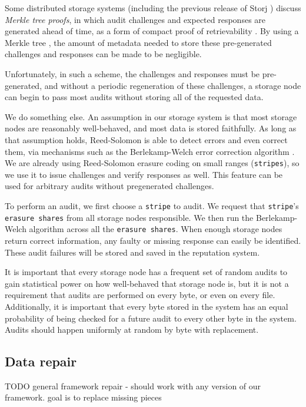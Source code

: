\documentclass[a4paper,10pt]{article} \usepackage[utf8]{inputenc}
\newcommand{\x}[1]{{\tt #1}} \newcommand{\code}[1]{{\tt #1}}
\newcommand{\todo}[1]{{\color{red} TODO #1 }}
\begin{document}
Some distributed storage systems (including the previous release of Storj
\cite{storj-v2}) discuss {\em Merkle tree proofs}, in which audit challenges
and expected responses are generated ahead of time, as a form of compact
proof of retrievability \cite{proof-of-retrievability}. By using a Merkle tree
\cite{merkle-tree}, the amount of metadata needed to store these pre-generated
challenges and responses can be made to be negligible.

Unfortunately, in such a scheme, the challenges and responses must be
pre-generated, and without a periodic regeneration of these challenges, a
storage node can begin to pass most audits without storing all of the requested
data.

We do something else.
An assumption in our storage system is that most storage nodes are
reasonably well-behaved, and most data is stored faithfully. As long as that
assumption holds, Reed-Solomon is able to detect errors and even correct them,
via mechanisms such as the Berlekamp-Welch error correction algorithm \cite{bw}.
We are already using Reed-Solomon erasure coding
\cite{rs} on small ranges (\x{stripes}), so we use it to issue challenges and
verify responses as well.
This feature can be used for arbitrary audits without pregenerated challenges.

To perform an audit, we first choose a \x{stripe} to audit. We request that
\x{stripe}'s \x{erasure shares} from all storage nodes responsible. We then run
the Berlekamp-Welch algorithm \cite{bw} across all the \x{erasure shares}. When
enough storage nodes return correct information, any faulty or missing response
can easily be identified. These audit failures will be stored and saved in the
reputation system.

It is important that every storage node has a frequent set of random audits to
gain statistical power on how well-behaved that storage node is, but it is not
a requirement that audits are performed on every byte, or even on every file.
Additionally, it is important that every byte stored in the system has an equal
probability of being checked for a future audit to every other byte in the
system. Audits should happen uniformly at random by byte with replacement.

\subsection{Data repair}\label{sec:data_repair}

\todo{general framework repair - should work with any version of our framework.
goal is to replace missing pieces}
\end{document}

